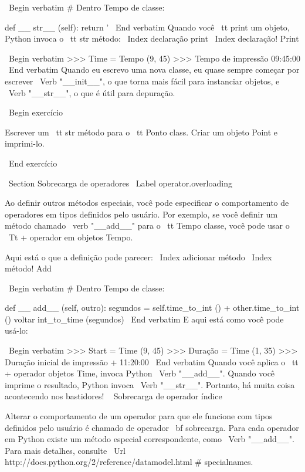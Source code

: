 \documentclass[10pt]{book}
\begin{document}
\begin {itemize}
{{{{{{{{{{{{{{\ Begin {verbatim}
# Dentro Tempo de classe:

    def __ str__ (self):
        return '%
\ End {verbatim}
%
Quando você {\ tt print} um objeto, Python invoca o {\ tt str} método:
\ Index {declaração print}
\ Index {declaração! Print}

\ Begin {verbatim}
>>> Time = Tempo (9, 45)
>>> Tempo de impressão
09:45:00
\ End {verbatim}
%
Quando eu escrevo uma nova classe, eu quase sempre começar por escrever 
\ Verb "__init__", o que torna mais fácil para instanciar objetos, e 
\ Verb "__str__", o que é útil para depuração.


\ Begin {} exercício

Escrever um {\ tt str} método para o {\ tt Ponto} class. Criar
um objeto Point e imprimi-lo.

\ End {} exercício


\ Section {} Sobrecarga de operadores
\ Label {} operator.overloading

Ao definir outros métodos especiais, você pode especificar o comportamento
de operadores em tipos definidos pelo usuário. Por exemplo, se você definir
um método chamado \ verb "__add__" para o {\ tt Tempo} classe, você pode usar o
{\ Tt +} operador em objetos Tempo.

Aqui está o que a definição pode parecer:
\ Index {adicionar método}
\ Index {método! Add}

\ Begin {verbatim}
# Dentro Tempo de classe:

    def __ add__ (self, outro):
        segundos = self.time_to_int () + other.time_to_int ()
        voltar int_to_time (segundos)
\ End {verbatim}
%
E aqui está como você pode usá-lo:

\ Begin {verbatim}
>>> Start = Time (9, 45)
>>> Duração = Time (1, 35)
>>> Duração inicial de impressão +
11:20:00
\ End {verbatim}
%
Quando você aplica o {\ tt +} operador objetos Time, invoca Python
\ Verb "__add__". Quando você imprime o resultado, Python invoca
\ Verb "__str__". Portanto, há muita coisa acontecendo nos bastidores!
\ {} Sobrecarga de operador índice

Alterar o comportamento de um operador para que ele funcione com
tipos definidos pelo usuário é chamado de operador {\ bf sobrecarga}. Para cada
operador em Python existe um método especial correspondente, como 
\ Verb "__add__". Para mais detalhes, consulte
\ Url {http://docs.python.org/2/reference/datamodel.html # specialnames}.

}}}}}}}}}}}}}}
\end{itemize}
\end{document}
